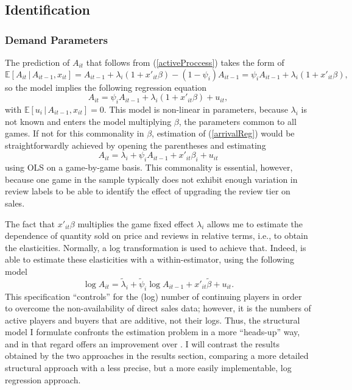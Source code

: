 \documentclass[12pt,pagebackref]{article}
\begin{document}
\hypertarget{identification}{%
\subsection{Identification}\label{identification}}

\hypertarget{demand-parameters}{%
\subsubsection{Demand Parameters}\label{demand-parameters}}

The prediction of \(A_{it}\) that follows from (\ref{activeProccess})
takes the form of \begin{equation}
\mathbb{E}\left[A_{it}\,|\,A_{it-1}, x_{it} \right] = A_{it-1} + \lambda_i(1+x'_{it}\beta) - (1-\psi_i)A_{it-1} = \psi_i A_{it-1} + \lambda_i(1+x'_{it}\beta),
\end{equation} so the model implies the following regression equation
\begin{equation}\label{arrivalReg}
 A_{it} = \psi_i A_{it-1} + \lambda_i(1+x'_{it}\beta) + u_{it},
\end{equation} with
\(\mathbb{E}\left[u_i\,|\,A_{it-1}, x_{it} \right] = 0\). This model is
non-linear in parameters, because \(\lambda_i\) is not known and enters
the model multiplying \(\beta\), the parameters common to all games. If
not for this commonality in \(\beta\), estimation of (\ref{arrivalReg})
would be straightforwardly achieved by opening the parentheses and
estimating \begin{equation}\label{arrivalRegInd}
A_{it} = \lambda_i + \psi_i A_{it-1} + x'_{it}\beta_i + u_{it}
\end{equation} using OLS on a game-by-game basis. This commonality is
essential, however, because one game in the sample typically does not
exhibit enough variation in review labels to be able to identify the
effect of upgrading the review tier on sales.

The fact that \(x'_{it}\beta\) multiplies the game fixed effect
\(\lambda_i\) allows me to estimate the dependence of quantity sold on
price and reviews in relative terms, i.e., to obtain the elasticities.
Normally, a log transformation is used to achieve that. Indeed,
\citet{SorokinStevens20} is able to estimate these elasticities with a
within-estimator, using the following model
\begin{equation}\label{logReg}
\log A_{it} = \tilde\lambda_i + \tilde\psi_i \log A_{it-1} + x'_{it}\tilde \beta + u_{it}.
\end{equation} This specification ``controls'' for the (log) number of
continuing players in order to overcome the non-availability of direct
sales data; however, it is the numbers of active players and buyers that
are additive, not their logs. Thus, the structural model I formulate
confronts the estimation problem in a more ``heads-up'' way, and in that
regard offers an improvement over \citet{SorokinStevens20}. I will
contrast the results obtained by the two approaches in the results
section, comparing a more detailed structural approach with a less
precise, but a more easily implementable, log regression approach.
\end{document}
